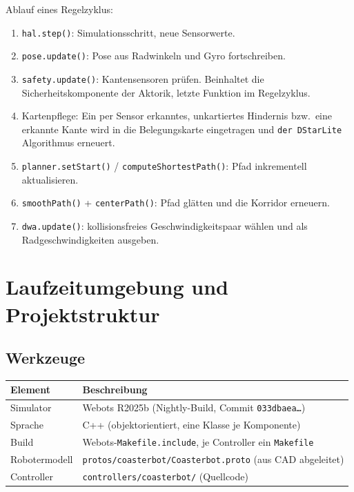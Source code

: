 \documentclass[
  a4paper,
  12pt,
  DIV=12,        %
  parskip=half,  %
  headings=small %
]{scrartcl}
\theoremstyle{definition}
\providecommand{\tightlist}{%
  \setlength{\itemsep}{0pt}\setlength{\parskip}{0pt}}
\theoremstyle{definition}
\begin{document}
Ablauf eines Regelzyklus:

\begin{enumerate}
\tightlist
\item
  \texttt{hal.step()}: Simulationsschritt, neue Sensorwerte.
\item
  \texttt{pose.update()}: Pose aus Radwinkeln und Gyro fortschreiben.
\item
  \texttt{safety.update()}: Kantensensoren prüfen. Beinhaltet die
  Sicherheitskomponente der Aktorik, letzte Funktion im Regelzyklus.
\item
  Kartenpflege: Ein per Sensor erkanntes, unkartiertes Hindernis
  bzw.\ eine erkannte Kante wird in die Belegungskarte eingetragen und
  \texttt{der DStarLite} Algorithmus erneuert.
\item
  \texttt{planner.setStart()} / \texttt{computeShortestPath()}: Pfad
  inkrementell aktualisieren.
\item
  \texttt{smoothPath()} + \texttt{centerPath()}: Pfad glätten und die
  Korridor erneuern.
\item
  \texttt{dwa.update()}: kollisionsfreies Geschwindigkeitspaar wählen
  und als Radgeschwindigkeiten ausgeben.
\end{enumerate}

\section{Laufzeitumgebung und Projektstruktur}\label{laufzeitumgebung}

\subsection{Werkzeuge}\label{werkzeuge}

\begin{longtable}[]{@{}p{}p{}@{}}
\toprule
\textbf{Element} & \textbf{Beschreibung}\\
\midrule
\endhead
Simulator & Webots R2025b (Nightly-Build, Commit \texttt{033dbaea\ldots})\\
Sprache & C++ (objektorientiert, eine Klasse je Komponente)\\
Build & Webots-\texttt{Makefile.include}, je Controller ein \texttt{Makefile}\\
Robotermodell & \texttt{protos/coasterbot/Coasterbot.proto} (aus CAD abgeleitet)\\
Controller & \texttt{controllers/coasterbot/} (Quellcode)\\
\bottomrule
\end{longtable}
\end{document}

